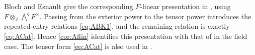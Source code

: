 \documentclass[a4paper,12pt,reqno]{amsart}
\numberwithin{equation}{section}
\theoremstyle{definition}
\newcommand{\Z}{\mathbb{Z}}
\begin{document}
Bloch and Esnault give the corresponding $F$-linear presentation in
\cite[Lemma~4.1]{BE03}, using
$F\otimes_{\Z}\bigwedge^qF^\times$.  Passing from the exterior power to
the tensor power introduces the repeated-entry relations \eqref{eq:ABK1},
and the remaining relation is exactly \eqref{eq:ACat}.  Hence
\autoref{cor:Aflin} identifies this presentation with that of
\cite[Lemma~4.2]{BK86} in the field case.  The tensor form
\eqref{eq:ACat} is also used in \cite[p.~497, (11)]{Hir14}.









%
%

\def\cprime{$'$}
\providecommand{\bysame}{\leavevmode\hbox to3em{\hrulefill}\thinspace}
\end{document}
